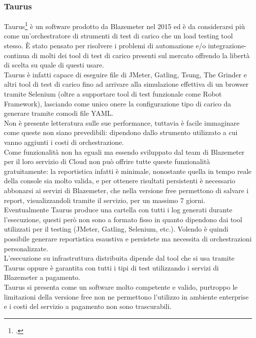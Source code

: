 \subsubsection{Taurus}
Taurus\footcite{site:taurus} è un software prodotto da Blazemeter nel 2015 ed è da considerarsi più come un'orchestratore di strumenti di test di carico che un load testing tool stesso. È stato pensato per risolvere i problemi di automazione e/o \gls{integrazione-continua} di molti dei tool di test di carico presenti sul mercato offrendo la libertà di scelta su quale di questi usare.\\
Taurus è infatti capace di eseguire file di JMeter, Gatling, Tsung, The Grinder e altri tool di test di carico fino ad arrivare alla simulazione effettiva di un browser tramite Selenium (oltre a supportare tool di test funzionale come Robot Framework), lasciando come unico onere la configurazione tipo di carico da generare tramite comodi file YAML. \\
Non è presente letteratura sulle sue performance, tuttavia è facile immaginare come queste non siano prevedibili: dipendono dallo strumento utilizzato a cui vanno aggiunti i costi di orchestrazione. \\
Come funzionalità non ha eguali ma essendo sviluppato dal team di Blazemeter per il loro servizio di Cloud non può offrire tutte queste funzionalità gratuitamente: la reportistica infatti è minimale, nonostante quella in tempo reale della console sia molto valida, e per ottenere risultati persistenti è necessario abbonarsi ai servizi di Blazemeter, che nella versione free permettono di salvare i report, visualizzandoli tramite il servizio, per un massimo 7 giorni.
Eventualmente Taurus produce una cartella con tutti i log generati durante l’esecuzione, questi però non sono a formato fisso in quanto dipendono dai tool utilizzati per il testing (JMeter, Gatling, Selenium, etc.). Volendo è quindi possibile generare reportistica esaustiva e persistete ma necessita di orchestrazioni personalizzate. \\
L'esecuzione su infrastruttura distribuita dipende dal tool che si usa tramite Taurus oppure è garantita con tutti i tipi di test utilizzando i servizi di Blazemeter a pagamento. \\
Taurus si presenta come un software molto competente e valido, purtroppo le limitazioni della versione free non ne permettono l'utilizzo in ambiente enterprise e i costi del servizio a pagamento non sono trascurabili.
